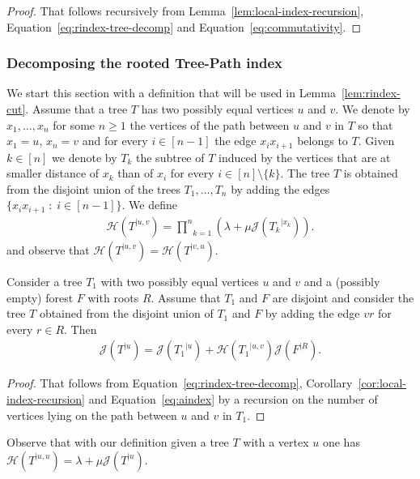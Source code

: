 \documentclass[11 pt]{modarticle}
\newcommand{\rtree}[2]{{#1}^{\lvert #2}}
\newcommand{\rindexsymbol}{\mathcal{J}}
\newcommand{\rindex}[2]{\rindexsymbol(\rtree{#2}{#1})}
\newcommand{\aindexsymbol}{\mathcal{H}}
\newcommand{\aindex}[3]{\aindexsymbol(\rtree{#3}{#1, #2})}
\begin{document}
\begin{proof}
That follows recursively from Lemma~\ref{lem:local-index-recursion}, Equation~\eqref{eq:rindex-tree-decomp} and Equation~\eqref{eq:commutativity}.
\end{proof}

\subsubsection{Decomposing the rooted Tree-Path index}

We start this section with a definition that will be used in Lemma~\ref{lem:rindex-cut}. Assume that a tree $T$ has two possibly equal vertices $u$ and $v$. We denote by $x_1, \dots, x_n$ for some $n \geq 1$ the vertices of the path between $u$ and $v$ in $T$ so that $x_1 = u$, $x_n = v$ and for every $i \in [n-1]$ the edge $x_i x_{i+1}$ belongs to $T$. Given $k \in [n]$ we denote by $T_k$ the subtree of $T$ induced by the vertices that are at smaller distance of $x_k$ than of $x_i$ for every $i \in [n] \setminus \{k\}$. The tree $T$ is obtained from the disjoint union of the trees $T_1, \dots, T_n$ by adding the edges $\{x_i x_{i+1} \;:\; i \in [n-1]\}$. We define
\begin{eqnarray}
	\aindex{u}{v}{T} = \underset{k=1}{\overset{n}{\prod}} (\lambda + \mu \rindex{x_k}{T_k}). \label{eq:aindex}
\end{eqnarray}
and observe that $\aindex{u}{v}{T} = \aindex{v}{u}{T}$.

\begin{lem}\label{lem:rindex-cut}
	Consider a tree $T_1$ with two possibly equal vertices $u$ and $v$ and a (possibly empty) forest $F$ with roots $R$. Assume that $T_1$ and $F$ are disjoint and consider the tree $T$ obtained from the disjoint union of $T_1$ and $F$ by adding the edge $vr$ for every $r \in R$. Then
\begin{eqnarray*}
	\rindex{u}{T} = \rindex{u}{T_1} + \aindex{u}{v}{T_1} \rindex{R}{F}.
\end{eqnarray*}
\end{lem}

\begin{proof}
That follows from Equation~\eqref{eq:rindex-tree-decomp}, Corollary~\ref{cor:local-index-recursion} and Equation~\eqref{eq:aindex} by a recursion on the number of vertices lying on the path between $u$ and $v$ in $T_1$.
\end{proof}

Observe that with our definition given a tree $T$ with a vertex $u$ one has $\aindex{u}{u}{T} = \lambda + \mu \rindex{u}{T}$.
\end{document}
